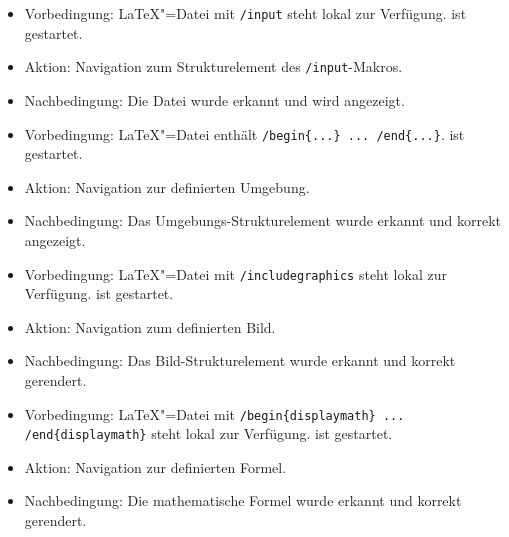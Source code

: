 
\begin{itemize}
\item Vorbedingung: \LaTeX"=Datei mit \verb|/input| steht lokal zur Verfügung.
  \texla{} ist gestartet.
  \item Aktion: Navigation zum Strukturelement des \verb|/input|-Makros.
  \item Nachbedingung: Die Datei wurde erkannt und wird angezeigt.

\end{itemize}

\begin{itemize}
\item Vorbedingung: \LaTeX"=Datei enthält \verb|/begin{...} ... /end{...}|.
  \texla{} ist gestartet.
  \item Aktion: Navigation zur definierten Umgebung.
  \item Nachbedingung: Das Umgebungs-Strukturelement wurde erkannt und korrekt angezeigt.

\end{itemize}

\begin{itemize}
\item Vorbedingung: \LaTeX"=Datei mit \verb|/includegraphics| steht lokal zur Verfügung.
  \texla{} ist gestartet.
  \item Aktion: Navigation zum definierten Bild.
  \item Nachbedingung: Das Bild-Strukturelement wurde erkannt und korrekt gerendert.

\end{itemize}

\begin{itemize}
\item Vorbedingung: \LaTeX"=Datei mit \verb|/begin{displaymath} ... /end{displaymath}| steht lokal zur Verfügung.
  \texla{} ist gestartet.
  \item Aktion: Navigation zur definierten Formel.
  \item Nachbedingung: Die mathematische Formel wurde erkannt und korrekt gerendert.

\end{itemize}
\clearpage


